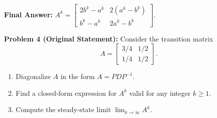 \documentclass[11pt, letterpaper]{article}
\theoremstyle{definition}
\theoremstyle{remark}
\begin{document}
\textbf{Final Answer:} $A^{k} = \begin{bmatrix} 2b^{k} - a^{k} & 2(a^{k} - b^{k}) \\ b^{k} - a^{k} & 2a^{k} - b^{k} \end{bmatrix}$.

\vspace{0.8em}
\textbf{Problem 4 (Original Statement):}
Consider the transition matrix
\[
A = \begin{bmatrix} 3/4 & 1/2 \\ 1/4 & 1/2 \end{bmatrix}.
\]
\begin{enumerate}[label=(\alph*)]
    \item Diagonalize $A$ in the form $A = PDP^{-1}$.
    \item Find a closed-form expression for $A^{k}$ valid for any integer $k \ge 1$.
    \item Compute the steady-state limit $\lim_{k \to \infty} A^{k}$.
\end{enumerate}
\end{document}
